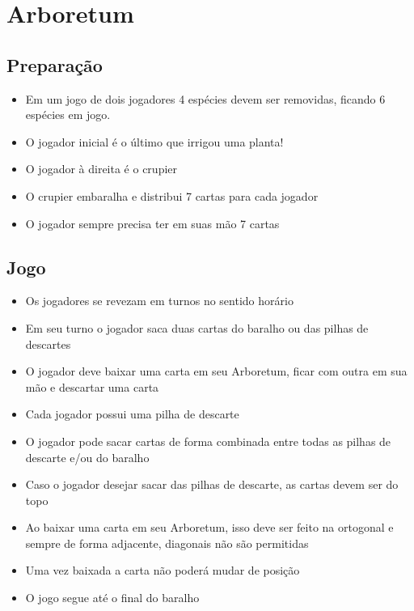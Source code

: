 \documentclass[11pt]{article}
\author{Fabio Favero Henkes}
\date{\today}
\title{}
\begin{document}
\tableofcontents

\section{Arboretum}
\label{sec:orgdecfc23}

\subsection{Preparação}
\label{sec:orgd69acec}

\begin{itemize}
\item Em um jogo de dois jogadores 4 espécies devem ser removidas, ficando 6 espécies em jogo.
\item O jogador inicial é o último que irrigou uma planta!
\item O jogador à direita é o crupier
\item O crupier embaralha e distribui 7 cartas para cada jogador
\item O jogador sempre precisa ter em suas mão 7 cartas
\end{itemize}

\subsection{Jogo}
\label{sec:org9cc0829}

\begin{itemize}
\item Os jogadores se revezam em turnos no sentido horário
\item Em seu turno o jogador saca duas cartas do baralho ou das pilhas de descartes
\item O jogador deve baixar uma carta em seu Arboretum, ficar com outra em sua mão e descartar uma carta
\item Cada jogador possui uma pilha de descarte
\item O jogador pode sacar cartas de forma combinada entre todas as pilhas de descarte e/ou do baralho
\item Caso o jogador desejar sacar das pilhas de descarte, as cartas devem ser do topo
\item Ao baixar uma carta em seu Arboretum, isso deve ser feito na ortogonal e sempre de forma adjacente, diagonais não são permitidas
\item Uma vez baixada a carta não poderá mudar de posição
\item O jogo segue até o final do baralho
\end{itemize}
\end{document}
